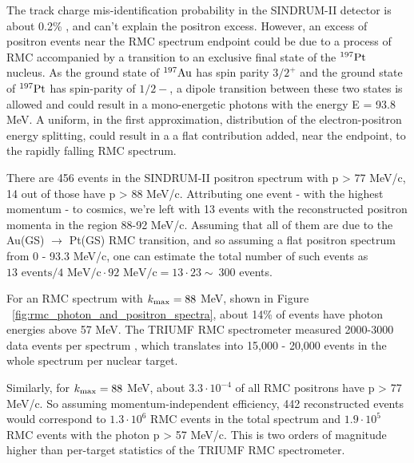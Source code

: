 \documentclass[12pt]{article}
\newcommand {\ra}        {\rightarrow}
\newcommand {\Au}[1]     {\mbox{$\rm ^{#1}Au$}}                 %
\newcommand {\kmax}      {k_{\rm max}}
\begin{document}
The track charge mis-identification probability in the SINDRUM-II detector
is about 0.2\% \cite{sindrum_ii:Kaulard1998}, and can't explain the positron excess.
%
However, an excess of positron events near the RMC spectrum endpoint could be due
to a process of RMC accompanied by a transition to an exclusive final state
of the $^{197}\rm Pt$ nucleus. As the ground state of \Au{197} has spin parity $3/2^+$
and the ground state of $^{197} \rm Pt$ has spin-parity of $1/2-$, a dipole transition
between these two states is allowed and could result in a mono-energetic photons
with the energy E = 93.8 MeV. A uniform, in the first approximation, distribution
of the electron-positron energy splitting, could result in a a flat contribution 
added, near the endpoint, to the rapidly falling RMC spectrum. 

There are 456 events in the SINDRUM-II positron spectrum with p > 77 MeV/c,
14 out of those have p > 88 MeV/c. Attributing one event - with the highest
momentum - to cosmics, we're left with 13 events with the reconstructed 
positron momenta in the region 88-92 MeV/c. Assuming that all of them are due
to the Au(GS) $\ra$ Pt(GS) RMC transition, and so assuming a flat positron spectrum
from 0 - 93.3 MeV/c, one can estimate the total number
of such events as $13\text{ events}/4\text{ MeV/c}\cdot 92\text{ MeV/c} = 13\cdot 23 \sim\ 300$ events.

For an RMC spectrum with $\kmax = 88$ MeV, shown in Figure ~\ref{fig:rmc_photon_and_positron_spectra}, 
about 14\% of events have photon energies above 57 MeV.
The TRIUMF RMC spectrometer measured 2000-3000 data events per spectrum \cite{}, which translates
into 15,000 - 20,000 events in the whole spectrum per nuclear target. 

Similarly, for $\kmax= 88$ MeV, about $3.3\cdot 10^{-4}$ of all RMC positrons have
p > 77 MeV/c. So assuming momentum-independent efficiency, 442 reconstructed events
would correspond to $1.3\cdot 10^6$ RMC events in the total spectrum and $1.9\cdot 10^5$ RMC events with
the photon p > 57 MeV/c. This is two orders of magnitude higher than
per-target statistics of the TRIUMF RMC spectrometer.
\end{document}
